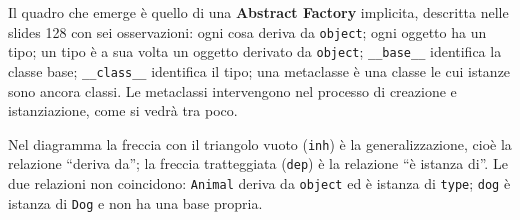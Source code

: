 \documentclass[12pt]{extarticle}
\begin{document}
\noindent Il quadro che emerge è quello di una \textbf{Abstract Factory} implicita, descritta nelle slides 128 con sei osservazioni: ogni cosa deriva da \texttt{object}; ogni oggetto ha un tipo; un tipo è a sua volta un oggetto derivato da \texttt{object}; \texttt{\_\_base\_\_} identifica la classe base; \texttt{\_\_class\_\_} identifica il tipo; una metaclasse è una classe le cui istanze sono ancora classi. Le metaclassi intervengono nel processo di creazione e istanziazione, come si vedrà tra poco.

\begin{center}
\end{center}

\noindent Nel diagramma la freccia con il triangolo vuoto (\texttt{inh}) è la generalizzazione, cioè la relazione ``deriva da''; la freccia tratteggiata (\texttt{dep}) è la relazione ``è istanza di''. Le due relazioni non coincidono: \texttt{Animal} deriva da \texttt{object} ed è istanza di \texttt{type}; \texttt{dog} è istanza di \texttt{Dog} e non ha una base propria.
\end{document}
